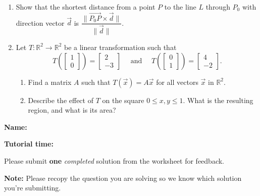 \documentclass[12pt]{article}
\newcommand{\len}[1]{\lVert #1\rVert}
\newcommand{\R}{\mathbb{R}}
\newcommand{\bbm}{\begin{bmatrix}}
\newcommand{\ebm}{\end{bmatrix}}
\begin{document}
\begin{enumerate}
\item Show that the shortest distance from a point $P$ to the line $L$ through $P_0$ with direction vector $\vec{d}$ is $\dfrac{\len{\overrightarrow{P_0P}\times\vec{d}}}{\len{\vec{d}}}$.

\vspace{24pt}

\item Let $T:\R^2\to \R^2$ be a linear transformation such that
\[
 T\left(\bbm 1\\0\ebm\right) = \bbm 2\\-3\ebm \quad\text{ and } \quad T\left(\bbm 0\\1\ebm\right) = \bbm 4\\-2\ebm.
\]
\begin{enumerate}
 \item Find a matrix $A$ such that $T(\vec{x}) = A\vec{x}$ for all vectors $\vec{x}$ in $\R^2$.

\bigskip

 \item Describe the effect of $T$ on the square $0\leq x, y\leq 1$. What is the resulting region, and what is its area?
\end{enumerate}
 \end{enumerate}

\newpage

{\large \bf Name:}

\vspace{24pt}

{\large \bf Tutorial time:}

\vspace{24pt}

Please submit \textbf{one} \textit{completed} solution from the worksheet for feedback. 

\textbf{Note:} Please recopy the question you are solving so we know which solution you're submitting.
\end{document}
